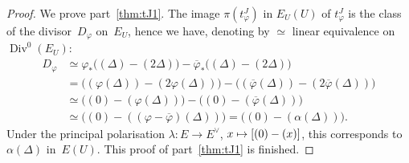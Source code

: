 \documentclass[JEP,XML,SOM,Unicode,NoFloatCountersInSection]{cedram}
\def\mto{\mathchoice{\longmapsto}{\mapsto}{\mapsto}{\mapsto}}
\let\oldvee\vee
\renewcommand{\vee}{{\scriptscriptstyle\oldvee}}
\theoremstyle{plain}
\theoremstyle{definition}
\numberwithin{equation}{subsection}
\let\ol\overline
\let\phi\varphi
\DeclareMathOperator{\Div}{Div}
\begin{document}
\begin{proof}
We prove part~\eqref{thm:tJ1}. The image $\pi(t^J_\phi)$ in $E_U(U)$ of
$t^J_\phi$ is the class of the divisor~$D_\phi$ on~$E_U$, hence we
have, denoting by $\simeq$ linear equivalence on $\Div^0(E_U)$:
\begin{align*}
D_\phi & \simeq \phi_*\big((\Delta)-(2\Delta)\big) - \ol{\phi}_*\big((\Delta)-(2\Delta)\big) \\
& = \big((\phi(\Delta))-(2\phi(\Delta))\big) - \big((\ol{\phi}(\Delta))-(2\ol{\phi}(\Delta))\big) \\
& \simeq \big( (0) - (\phi(\Delta))\big) - \big((0) - (\ol{\phi}(\Delta))\big) \\
& \simeq \big((0) - ((\phi-\ol{\phi})(\Delta))\big) = \big((0) - (\alpha(\Delta))\big).
\end{align*}
Under the principal polarisation $\lambda\colon E\to E^\vee$,
$x\mto [(0)-(x)]$, this corresponds to $\alpha(\Delta)$ in~$E(U)$.
This proof of part~\eqref{thm:tJ1} is finished.


\end{proof}
\end{document}
